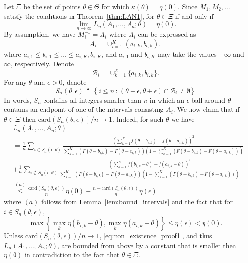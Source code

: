 \documentclass[letterpaper, 11pt]{IEEEtran}      %
\newcommand{\card}{\mathrm{card}}
\begin{document}
Let $\Xi$ be the set of points $\theta \in \Theta$ for which $\kappa(\theta) = \eta(0)$. 
%
Since $M_1,M_2,\ldots$ satisfy the conditions in Theorem~\ref{thm:LAN1}, for $\theta \in \Xi$ if and only if
\begin{equation}
\label{eq:non_existence_proof}
\lim_{n\to \infty} L_n(A_1,\ldots,A_n;\theta) = \eta(0). 
\end{equation}
By assumption, we have $M_i^{-1} = A_i$ where $A_i$ can be expressed as
\[
A_i = \cup_{i=1}^K (a_{i,k},b_{i,k}), 
\]
where $a_{i,1} \leq b_{i,1} \leq \ldots \leq a_{i,K}, b_{i,K}$, and $a_{i,1}$ and $b_{i,K}$ may take the values $-\infty$ and $\infty$, respectively. Denote
\[
\mathcal B_i = \cup_{k=1}^{K}\{a_{i,k},b_{i,k}\}.
\]
For any $\theta$ and $\epsilon>0$, denote 
\[
S_n(\theta, \epsilon) \triangleq \left\{ i\leq n \,:\, (\theta-\epsilon,\theta+\epsilon) \cap \mathcal B_i \neq \emptyset \right\}
\]
In words, $S_n$ contains all integers smaller than $n$ in which an $\epsilon$-ball around $\theta$ contains an endpoint of one of the intervals consisting $A_i$. 
%
We now claim that 
if $\theta \in \Xi$ then $\card(S_n(\theta, \epsilon))/n \to 1$. Indeed, for such $\theta$ we have
\begin{align}
& L_n(A_1,\ldots,A_n; \theta) \nonumber \\
& = \frac{1}{n} \sum_{i \in S_n(\epsilon,\theta)}  
\frac{ \left(\sum_{k=1}^{K}  f(\theta - b_{i,k})- f(\theta - a_{i,k}) \right)^2}{ \sum_{k=1}^{K} \left( F(\theta - b_{i,k})- F(\theta - a_{i,k}) \right) \left(1-\sum_{k=1}^{K} \left( F(\theta - b_{i,k})- F(\theta - a_{i,k}) \right)\right)} \nonumber \\
& 
+ \frac{1}{n}\sum_{i \notin S_n(\epsilon,\theta) } \frac{ \left(\sum_{k=1}^{K}  f(b_{i,k}-\theta) - f(a_{i,k}-\theta) \right)^2} { \sum_{k=1}^{K} \left( F(\theta - b_{i,k})- F(\theta - a_{i,k}) \right) \left(1-\sum_{k=1}^{K} \left( F(\theta - b_{i,k})- F(\theta - a_{i,k}) \right)\right)} \nonumber \\
& \overset{(a)}{\leq}
\frac{\card\left(S_n(\theta,\epsilon)\right)}{n} \eta(0) + \frac{n-\card\left(S_n(\theta,\epsilon) \right) }{n} \eta(\epsilon) 
 \label{eq:non_existence_proof1}
\end{align}
where $(a)$ follows from Lemma~\ref{lem:bound_intervals} and the fact that for $i \in S_n(\theta, \epsilon)$, 
\[
\max\left\{ \max_k \eta(b_{i,k}-\theta) , \max_k \eta(a_{i,k}-\theta)  \right\} \leq \eta(\epsilon) < \eta(0). 
\]
Unless  $\card \left(S_n(\theta, \epsilon) \right)/n \to 1$, \eqref{eq:non_existence_proof1}, and thus $L_n(A_1,\ldots,A_n ; \theta)$, are bounded from above by a constant that is smaller then $\eta(0)$ in contradiction to the fact that $\theta \in \Xi$. \par
\end{document}
